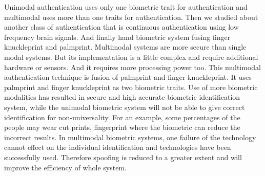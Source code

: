 \documentclass[10pt,a4paper,journal]{IEEEtran}
\begin{document}
\hspace{2em} Unimodal authentication uses only one biometric trait for authentication and multimodal uses more than one traits for authentication. Then we studied about another class of authentication that is continuous authentication using low frequency brain signals. And finally hand biometric system fusing finger knuckleprint and palmprint. Multimodal systems are more secure than single modal systems. But its implementation is a little complex and require additional hardware or sensors. And it requires more processing power too. This multimodal authentication technique is fusion of palmprint and finger knuckleprint. It uses palmprint and finger knuckleprint as two biometric traits. Use of more biometric modalities has resulted in secure and high accurate biometric identification system, while the unimodal biometric system will not be able to give correct identification for non-universality. For an example, some percentages of the people may wear cut prints, fingerprint where the biometric can reduce the incorrect results. In multimodal biometric systems, one failure of the technology cannot effect on the individual identification and technologies have been successfully used. Therefore spoofing is reduced to a greater extent and will improve the efficiency of whole system. 
\end{document}
